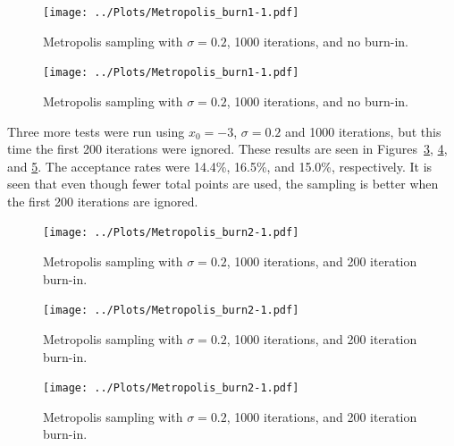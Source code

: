 \documentclass[twocolumn]{myarticle}
\begin{document}
\begin{figure}[ht!]
    \begin{center}
    \texttt{[image: ../Plots/Metropolis\_burn1-1.pdf]}
    \caption{%
    Metropolis sampling with $ \sigma = 0.2 $, 1000 iterations, and no burn-in.
    }
    \label{fig:metropolis_burn_1_2}
    \end{center}
\end{figure}

\begin{figure}[ht!]
    \begin{center}
    \texttt{[image: ../Plots/Metropolis\_burn1-1.pdf]}
    \caption{%
    Metropolis sampling with $ \sigma = 0.2 $, 1000 iterations, and no burn-in.
    }
    \label{fig:metropolis_burn_1_3}
    \end{center}
\end{figure}

Three more tests were run using $ x_0 = -3 $, $ \sigma = 0.2 $ and 1000 iterations, but this time the first 200 iterations were ignored.
These results are seen in Figures~\ref{fig:metropolis_burn_2_1}, \ref{fig:metropolis_burn_2_2}, and \ref{fig:metropolis_burn_2_3}.
The acceptance rates were 14.4\%, 16.5\%, and 15.0\%, respectively.
It is seen that even though fewer total points are used, the sampling is better when the first 200 iterations are ignored.

\begin{figure}[ht!]
    \begin{center}
    \texttt{[image: ../Plots/Metropolis\_burn2-1.pdf]}
    \caption{%
    Metropolis sampling with $ \sigma = 0.2 $, 1000 iterations, and 200 iteration burn-in.
    }
    \label{fig:metropolis_burn_2_1}
    \end{center}
\end{figure}

\begin{figure}[ht!]
    \begin{center}
    \texttt{[image: ../Plots/Metropolis\_burn2-1.pdf]}
    \caption{%
    Metropolis sampling with $ \sigma = 0.2 $, 1000 iterations, and 200 iteration burn-in.
    }
    \label{fig:metropolis_burn_2_2}
    \end{center}
\end{figure}

\begin{figure}[ht!]
    \begin{center}
    \texttt{[image: ../Plots/Metropolis\_burn2-1.pdf]}
    \caption{%
    Metropolis sampling with $ \sigma = 0.2 $, 1000 iterations, and 200 iteration burn-in.
    }
    \label{fig:metropolis_burn_2_3}
    \end{center}
\end{figure}
\end{document}
